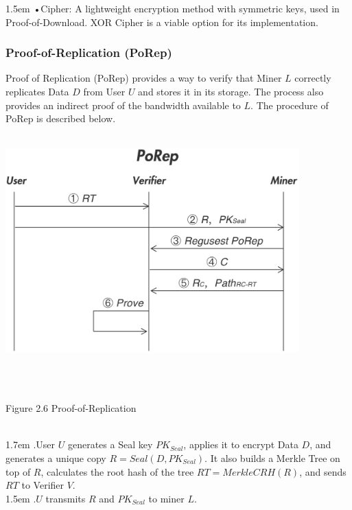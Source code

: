 \documentclass[10pt,a4paper]{article}
\begin{document}
\hangindent 1.5em
\noindent   
•\quad Cipher: A lightweight encryption method with symmetric keys, used in Proof-of-Download. XOR Cipher is a viable option for its implementation.  
\vspace{-0.5em}

               \subsubsection{Proof-of-Replication (PoRep)}  %
               
Proof of Replication (PoRep) provides a way to verify that Miner $L$ correctly replicates Data $D$ from User $U$ and stores it in its storage. The process also provides an indirect proof of the bandwidth available to $L$. The procedure of PoRep is described below.
\vspace{-0.8em}
\\ \\ 
\centerline{\includegraphics[width=320pt]{fig6}}
\\ \\\centerline{{Figure 2.6 Proof-of-Replication}}
\vspace{-1.5em}
\\

\hangindent 1.7em
.\quad User $U$ generates a Seal key $PK_{Seal}$, applies it to encrypt Data $D$, and generates a unique copy $R=Seal(D, PK_{Seal})$. It also builds a Merkle Tree on top of $R$, calculates the root hash of the tree $RT=MerkleCRH(R)$, and sends $RT$ to Verifier $V$.
\vspace{-0.8em}
\\

\hangindent 1.5em
.\quad $U$ transmits $R$ and $PK_{Seal}$ to miner $L$.
\vspace{-0.8em}
\\
\end{document}
